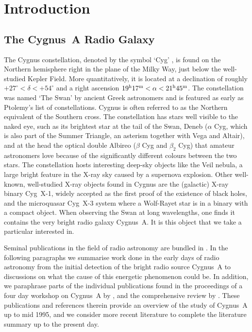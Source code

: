 \documentclass[MScProj_TLRH_ClusterEnergy.tex]{subfiles}
\begin{document}
\section{Introduction}
\label{sec:introduction}


\subsection{The Cygnus~A Radio Galaxy}
The Cygnus constellation, denoted by the symbol `Cyg'
\citep{1922PA.....30..469R}, is found on the Northern hemisphere right in the
plane of the Milky Way, just below the well-studied Kepler Field. More
quantitatively, it is located at a declination of roughly $+27^\circ < \delta <
+54^\circ$ and a right ascension $19^{\rm h}17^{\rm m} < \alpha < 21^{\rm
h}45^{\rm m}$. The constellation was named `The Swan' by ancient Greek
astronomers and is featured as early as Ptolemy's list of constellations. Cygnus
is often referred to as the Northern equivalent of the Southern cross. The
constellation has stars well visible to the naked eye, such as its brightest
star at the tail of the Swan, Deneb ($\alpha$ Cyg, which is also part of the
Summer Triangle, an asterism together with Vega and Altair), and at the head the
optical double Albireo ($\beta$ Cyg and $\beta_2$ Cyg) that amateur astronomers
love because of the significantly different colours between the two stars. The
constellation hosts interesting deep-sky objects like the Veil nebula, a large
bright feature in the X-ray sky caused by a supernova explosion. Other
well-known, well-studied X-ray objects found in Cygnus are the (galactic) X-ray
binary Cyg~X-1, widely accepted as the first proof of the existence of black
holes, and the microquasar Cyg~X-3 system where a Wolf-Rayet star is in a binary
with a compact object. When observing the Swan at long wavelengths, one finds it
contains the very bright radio galaxy Cygnus~A. It is this object that we take a
particular interested in.


Seminal publications in the field of radio astronomy are bundled in
\citet{1982cra..book.....S}. In the following paragraphs we summarise work done
in the early days of radio astronomy from the initial detection of the bright
radio source Cygnus~A to discussions on what the cause of this energetic
phenomenon could be. In addition, we paraphrase parts of the individual
publications found in the proceedings of a four day workshop on Cygnus~A by
\citet{1996cyga.book.....C}, and the comprehensive review by
\citet{1996A&ARv...7....1C}. These publications and references therein provide
an overview of the study of Cygnus~A up to mid 1995, and we consider more recent
literature to complete the literature summary up to the present day.
\end{document}
